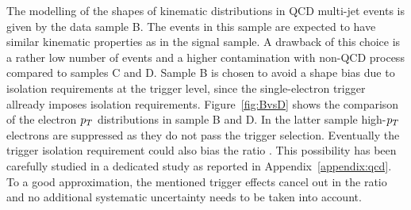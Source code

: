 The modelling of the shapes of kinematic distributions in QCD multi-jet events is given by the data sample B.
The events in this sample are expected to have similar kinematic properties as in  the signal sample.
A drawback of this choice is a rather low number of events and a higher contamination with non-QCD process compared to samples C and D.
Sample B is chosen  to avoid a shape bias due to isolation requirements at the trigger level, since the single-electron trigger 
allready imposes isolation requirements. 
Figure~\ref{fig:BvsD} shows the comparison of the electron $p_{T}$ distributions in sample B and D. In the latter sample 
high-$p_{T}$ electrons are suppressed as they do not pass the trigger selection. 
Eventually the trigger isolation requirement could also 
bias the ratio \rqcd. This possibility has been carefully studied 
in a dedicated study as reported in Appendix~\ref{appendix:qcd}.
To a good approximation, the mentioned trigger effects cancel out in the ratio
\rqcd and no additional systematic uncertainty needs to be taken into account.

